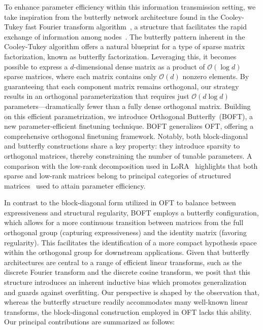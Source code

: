 To enhance parameter efficiency within this information transmission setting, we take inspiration from the butterfly network architecture found in the Cooley-Tukey fast Fourier transform algorithm~\cite{cooley1965algorithm}, a structure that facilitates the rapid exchange of information among nodes~\cite{klasing1994broadcasting}. The butterfly pattern inherent in the Cooley-Tukey algorithm offers a natural blueprint for a type of sparse matrix factorization, known as butterfly factorization. Leveraging this, it becomes possible to express a $d$-dimensional dense matrix as a product of $\mathcal{O}(\log d)$ sparse matrices, where each matrix contains only $\mathcal{O}(d)$ nonzero elements. By guaranteeing that each component matrix remains orthogonal, our strategy results in an orthogonal parameterization that requires just $\mathcal{O}(d\log d)$ parameters—dramatically fewer than a fully dense orthogonal matrix. Building on this efficient parametrization, we introduce Orthogonal Butterfly~(BOFT), a new parameter-efficient finetuning technique. BOFT generalizes OFT, offering a comprehensive orthogonal finetuning framework. Notably, both block-diagonal and butterfly constructions share a key property: they introduce sparsity to orthogonal matrices, thereby constraining the number of tunable parameters. A comparison with the low-rank decomposition used in LoRA~\cite{hulora2022} highlights that both sparse and low-rank matrices belong to principal categories of structured matrices~\cite{candes2011robust} used to attain parameter efficiency.

In contrast to the block-diagonal form utilized in OFT to balance between expressiveness and structural regularity, BOFT employs a butterfly configuration, which allows for a more continuous transition between matrices from the full orthogonal group (capturing expressiveness) and the identity matrix (favoring regularity). This facilitates the identification of a more compact hypothesis space within the orthogonal group for downstream applications. Given that butterfly architectures are central to a range of efficient linear transforms, such as the discrete Fourier transform and the discrete cosine transform, we posit that this structure introduces an inherent inductive bias which promotes generalization and guards against overfitting. Our perspective is shaped by the observation that, whereas the butterfly structure readily accommodates many well-known linear transforms, the block-diagonal construction employed in OFT lacks this ability. Our principal contributions are summarized as follows:

